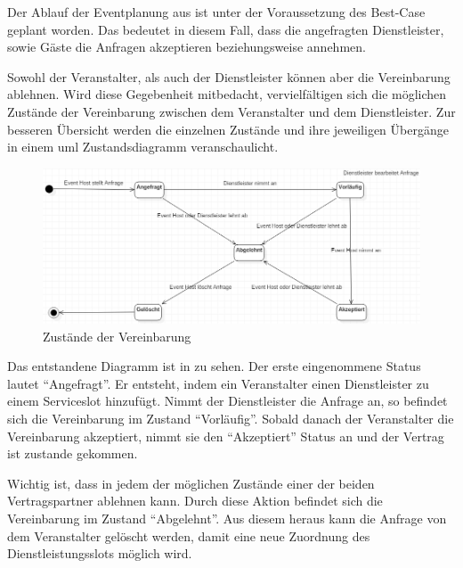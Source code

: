 

Der Ablauf der Eventplanung aus  ist unter der Voraussetzung des Best-Case geplant worden. Das bedeutet in diesem Fall, dass die angefragten Dienstleister, sowie Gäste die Anfragen akzeptieren beziehungsweise annehmen.

Sowohl der Veranstalter, als auch der Dienstleister können aber die Vereinbarung ablehnen. Wird diese Gegebenheit mitbedacht, vervielfältigen sich die möglichen Zustände der Vereinbarung zwischen dem Veranstalter und dem Dienstleister. Zur besseren Übersicht werden die einzelnen Zustände und ihre jeweiligen Übergänge in einem \gls{uml} Zustandsdiagramm veranschaulicht.

\begin{figure}[ht]
\centering
\includegraphics[width=\textwidth]{res/images/AgreementStates.png}
\caption{Zustände der Vereinbarung}
\label{as1}
\end{figure}

Das entstandene Diagramm ist in  zu sehen.
Der erste eingenommene Status lautet \enquote{Angefragt}. Er entsteht, indem ein Veranstalter einen Dienstleister zu einem Serviceslot hinzufügt. Nimmt der Dienstleister die Anfrage an, so befindet sich die Vereinbarung im Zustand \enquote{Vorläufig}. Sobald danach der Veranstalter die Vereinbarung akzeptiert, nimmt sie den \enquote{Akzeptiert} Status an und der Vertrag ist zustande gekommen.

Wichtig ist, dass in jedem der möglichen Zustände einer der beiden Vertragspartner ablehnen kann. Durch diese Aktion befindet sich die Vereinbarung im Zustand \enquote{Abgelehnt}. Aus diesem heraus kann die Anfrage von dem Veranstalter gelöscht werden, damit eine neue Zuordnung des Dienstleistungsslots möglich wird.
